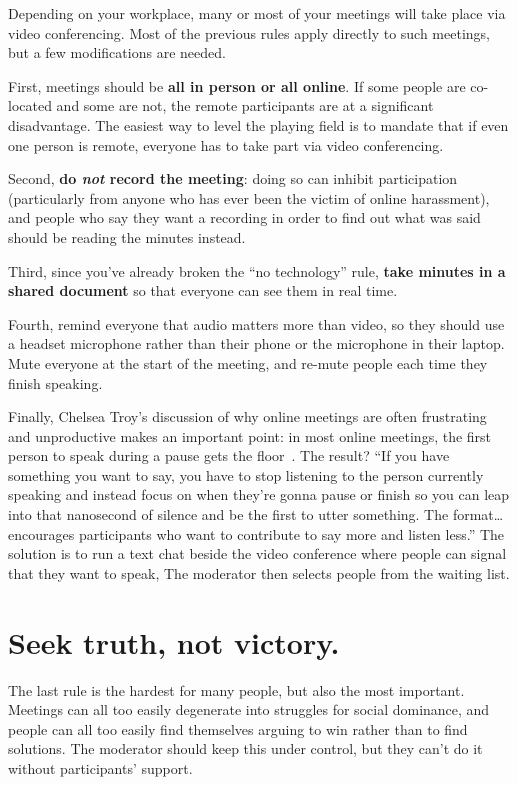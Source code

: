 \documentclass[10pt,letterpaper]{article}
\newcommand{\rulemajor}[1]{\section{#1}}
\begin{document}
Depending on your workplace, many or most of your  meetings will take place via
video conferencing. Most of the previous rules apply directly to such meetings,
but a few modifications are needed.

First, meetings should be \textbf{all in person or all online}. If some people
are co-located and some are not, the remote participants are at a significant
disadvantage. The easiest way to level the playing field is to mandate that if
even one person is remote, everyone has to take part via video conferencing.

Second, \textbf{do \emph{not} record the meeting}: doing so can inhibit
participation (particularly from anyone who has ever been the victim of online
harassment), and people who say they want a recording in order to find out what
was said should be reading the minutes instead.

Third, since you've already broken the ``no technology'' rule, \textbf{take
minutes in a shared document} so that everyone can see them in real time.

Fourth, remind everyone that audio matters more than video, so they should use a
headset microphone rather than their phone or the microphone in their laptop.
Mute everyone at the start of the meeting, and re-mute people each time they
finish speaking.

Finally, Chelsea Troy's discussion of why online meetings are often frustrating
and unproductive makes an important point: in most online meetings, the first
person to speak during a pause gets the floor~\cite{Troy2018}.  The result?
``If you have something you want to say, you have to stop listening to the
person currently speaking and instead focus on when they're gonna pause or
finish so you can leap into that nanosecond of silence and be the first to utter
something.  The format{\ldots}encourages participants who want to contribute to
say more and listen less.''  The solution is to run a text chat beside the video
conference where people can signal that they want to speak, The moderator then
selects people from the waiting list.

\rulemajor{Seek truth, not victory.}

The last rule is the hardest for many people, but also the most important.
Meetings can all too easily degenerate into struggles for social dominance, and
people can all too easily find themselves arguing to win rather than to find
solutions.  The moderator should keep this under control, but they can't do it
without participants' support.
\end{document}
